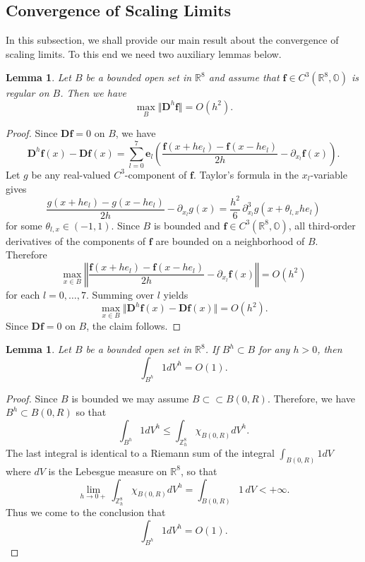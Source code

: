 \documentclass{amsart}
\newtheorem{lemma}[theorem]{Lemma}
\theoremstyle{definition}
\theoremstyle{remark}
\numberwithin{equation}{section}
\newcommand{\R}{\mathbb{R}}
\newcommand{\p}{\partial}
\newcommand{\OO}{\mathbb O}
\newcommand{\Z}{\mathbb Z}
\newcommand{\f}{\bm{f}}
\newcommand{\e}{\bm{e}}
\begin{document}
\subsection{Convergence of Scaling Limits} In this subsection,  we shall  provide our main result about the convergence of scaling limits.  To this end we need   two auxiliary lemmas below.
\begin{lemma}\label{2023-09-11 19:48:45}
  Let $B$ be a bounded open set in $\R^8$ and assume that $\f \in C^3(\R^8,\OO)$ is regular on $B$. Then we have \[
\max_{B} \Vert \bm D^h \f\Vert  = O(h^2).
\]
\end{lemma}
\begin{proof}
    Since \(\bm D\f=0\) on \(B\), we have
    \[
        \bm D^h\f(x)-\bm D\f(x)
        =
        \sum_{l=0}^7 \e_l\left(
        \frac{\f(x+he_l)-\f(x-he_l)}{2h}-\p_{x_l}\f(x)\right).
    \]
    Let \(g\) be any real-valued \(C^3\)-component of \(\f\). Taylor's formula in the \(x_l\)-variable gives
    \[
        \frac{g(x+he_l)-g(x-he_l)}{2h}-\p_{x_l}g(x)
        =
        \frac{h^2}{6}\,\p_{x_l}^3 g(x+\theta_{l,x}he_l)
    \]
    for some \(\theta_{l,x}\in(-1,1)\). Since \(B\) is bounded and \(\f\in C^3(\R^8,\OO)\), all third-order derivatives of the components of \(\f\) are bounded on a neighborhood of \(B\). Therefore
    \[
        \max_{x\in B}\left\Vert
        \frac{\f(x+he_l)-\f(x-he_l)}{2h}-\p_{x_l}\f(x)
        \right\Vert
        =O(h^2)
    \]
    for each \(l=0,\dots,7\). Summing over \(l\) yields
    \[
        \max_{x\in B}\Vert \bm D^h\f(x)-\bm D\f(x)\Vert=O(h^2).
    \]
    Since \(\bm D\f=0\) on \(B\), the claim follows.
\end{proof}

\begin{lemma}\label{2023-09-11 19:50:23}
    Let $B$ be a bounded open set in $\R^8$. If $B^h \subset B$ for any $h>0$, then  \[
\int_{B^h}  1dV ^h = O(1).
\]
\end{lemma}
\begin{proof}
    Since $B$ is bounded we may assume $B\subset\subset B(0,R).$ Therefore, we have $B^h \subset B(0,R)$ so that
    \[
\int_{B^h} 1 dV^h \leqslant \int_{\Z^8_h} \chi_{B(0,R)} dV^h.
\]
    The last integral is identical to a Riemann sum of the integral $\int_{B(0,R)} 1 dV$ where $dV$ is the Lebesgue measure on $\R^8$, so that
    \[
\lim_{h\to 0+} \int_{\Z^8_h} \chi_{B(0,R)} dV^h = \int_{B(0,R)}1\,dV < +\infty.
\]
    Thus we come to the conclusion that
    \[
\int_{B^h}1 dV^h = O(1).
\]
\end{proof}
\end{document}
